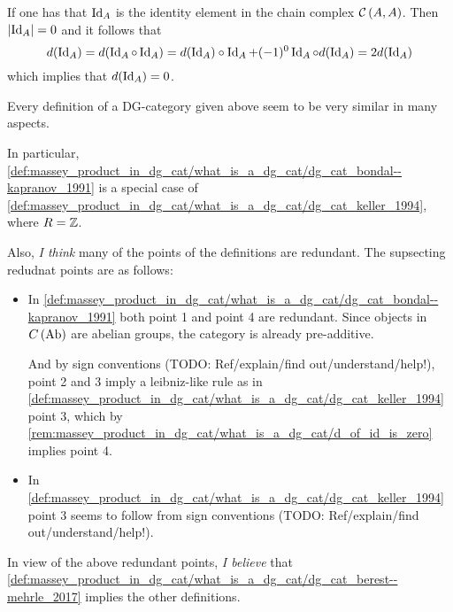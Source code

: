 \begin{remark}
    \label{rem:massey_product_in_dg_cat/what_is_a_dg_cat/d_of_id_is_zero}
    If one has that \( \operatorname{Id}_A \) is the identity element in the chain complex \( {\mathcal{C}}\left( A, A \right) \). Then \( \lvert \operatorname{Id}_A \rvert = 0 \) and it follows that
    \[
        d(\operatorname{Id}_A) = d(\operatorname{Id}_A \circ \operatorname{Id}_A) = d(\operatorname{Id}_A) \circ \operatorname{Id}_A + (-1)^0 \operatorname{Id}_A \circ d(\operatorname{Id}_A) = 2d(\operatorname{Id}_A)
    \]
    which implies that \( d(\operatorname{Id}_A) = 0 \).
\end{remark}

\begin{remark}
    Every definition of a DG-category given above seem to be very similar in many aspects.

    In particular, \autoref{def:massey_product_in_dg_cat/what_is_a_dg_cat/dg_cat_bondal--kapranov_1991} is a special case of \autoref{def:massey_product_in_dg_cat/what_is_a_dg_cat/dg_cat_keller_1994}, where \( R = {\mathbb{Z}} \).

    Also, \emph{I think} many of the points of the definitions are redundant. The supsecting redudnat points are as follows:
    \begin{itemize}
        \item {
            In \autoref{def:massey_product_in_dg_cat/what_is_a_dg_cat/dg_cat_bondal--kapranov_1991} both point 1 and point 4 are redundant. Since objects in \( C \left( \operatorname{Ab} \right) \) are abelian groups, the category is already pre-additive.
            
            And by sign conventions (TODO: Ref/explain/find out/understand/help!), point 2 and 3 imply a leibniz-like rule as in \autoref{def:massey_product_in_dg_cat/what_is_a_dg_cat/dg_cat_keller_1994} point 3, which by \autoref{rem:massey_product_in_dg_cat/what_is_a_dg_cat/d_of_id_is_zero} implies point 4.
        }
        \item {
            In \autoref{def:massey_product_in_dg_cat/what_is_a_dg_cat/dg_cat_keller_1994} point 3 seems to follow from sign conventions (TODO: Ref/explain/find out/understand/help!).
        }
    \end{itemize}

    In view of the above redundant points, \emph{I believe} that \autoref{def:massey_product_in_dg_cat/what_is_a_dg_cat/dg_cat_berest--mehrle_2017} implies the other definitions.
\end{remark}

